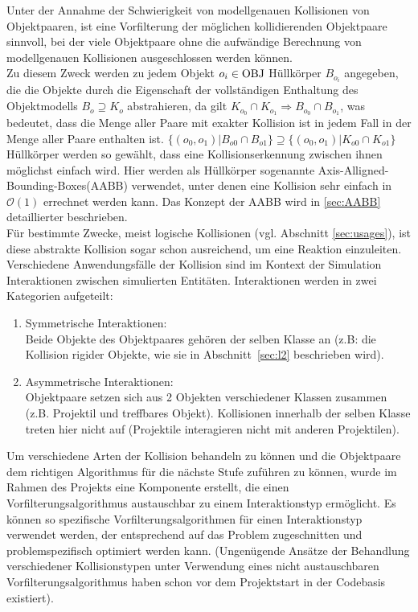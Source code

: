 \label{sec:l1}
Unter der Annahme der Schwierigkeit von modellgenauen Kollisionen von Objektpaaren, ist eine Vorfilterung der möglichen kollidierenden Objektpaare sinnvoll, bei der viele Objektpaare ohne die aufwändige Berechnung von modellgenauen Kollisionen ausgeschlossen werden können.\\
Zu diesem Zweck werden zu jedem Objekt $o_i \in \operatorname{OBJ}$ Hüllkörper \cite[ch. 8.1, p. 211]{fourcrossfour} $B_{o_i}$ angegeben, die die Objekte durch die Eigenschaft der vollständigen Enthaltung des Objektmodells $B_o \supseteq K_o$ abstrahieren, da gilt $K_{o_0} \cap K_{o_1} \Rightarrow B_{o_0} \cap B_{o_1}$, was bedeutet, dass die Menge aller Paare mit exakter Kollision ist in jedem Fall in der Menge aller Paare enthalten ist. $ \{ (o_0, o_1) | B_{o0} \cap B_{o1} \} \supseteq \{ (o_0, o_1) | K_{o0} \cap K_{o1} \} $\\
Hüllkörper werden so gewählt, dass eine Kollisionserkennung zwischen ihnen möglichst einfach wird. Hier werden als Hüllkörper sogenannte Axis-Alligned-Bounding-Boxes(AABB) verwendet, unter denen eine Kollision sehr einfach in $\mathcal{O}(1)$ errechnet werden kann. Das Konzept der AABB wird in \ref{sec:AABB} detaillierter beschrieben.\\
Für bestimmte Zwecke, meist logische Kollisionen (vgl. Abschnitt \ref{sec:usages}), ist diese abstrakte Kollision sogar schon ausreichend, um eine Reaktion einzuleiten.\\

Verschiedene Anwendungsfälle der Kollision sind im Kontext der Simulation Interaktionen zwischen simulierten Entitäten.
Interaktionen werden in zwei Kategorien aufgeteilt:
\begin{enumerate}
\item Symmetrische Interaktionen:\\
Beide Objekte des Objektpaares gehören der selben Klasse an (z.B: die Kollision rigider Objekte, wie sie in Abschnitt~\ref{sec:l2} beschrieben wird).
\item Asymmetrische Interaktionen:\\
Objektpaare setzen sich aus 2 Objekten verschiedener Klassen zusammen (z.B. Projektil und treffbares Objekt). Kollisionen innerhalb der selben Klasse treten hier nicht auf (Projektile interagieren nicht mit anderen Projektilen).
\end{enumerate}

Um verschiedene Arten der Kollision behandeln zu können und die Objektpaare dem richtigen Algorithmus für die nächste Stufe zuführen zu können, wurde im Rahmen des Projekts eine Komponente erstellt, die einen Vorfilterungsalgorithmus austauschbar zu einem Interaktionstyp ermöglicht. Es können so spezifische Vorfilterungsalgorithmen für einen Interaktionstyp verwendet werden, der entsprechend auf das Problem zugeschnitten und problemspezifisch optimiert werden kann. (Ungenügende Ansätze der Behandlung verschiedener Kollisionstypen unter Verwendung eines nicht austauschbaren Vorfilterungsalgorithmus haben schon vor dem Projektstart in der Codebasis existiert). \\

